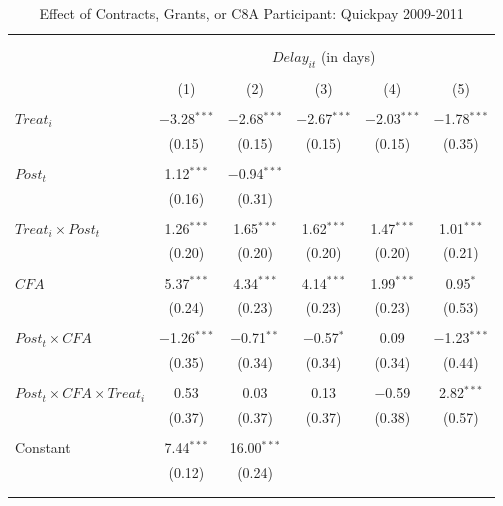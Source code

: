 \documentclass[
]{article}
\begin{document}
\begin{table}[H] \centering 
  \caption{Effect of Contracts, Grants, or C8A Participant: Quickpay 2009-2011} 
  \label{} 
\small 
\begin{tabular}{@{\extracolsep{-2pt}}lccccc} 
\\[-1.8ex]\hline 
\hline \\[-1.8ex] 
\\[-1.8ex] & \multicolumn{5}{c}{$Delay_{it}$ (in days)} \\ 
\\[-1.8ex] & (1) & (2) & (3) & (4) & (5)\\ 
\hline \\[-1.8ex] 
 $Treat_i$ & $-$3.28$^{***}$ & $-$2.68$^{***}$ & $-$2.67$^{***}$ & $-$2.03$^{***}$ & $-$1.78$^{***}$ \\ 
  & (0.15) & (0.15) & (0.15) & (0.15) & (0.35) \\ 
  & & & & & \\ 
 $Post_t$ & 1.12$^{***}$ & $-$0.94$^{***}$ &  &  &  \\ 
  & (0.16) & (0.31) &  &  &  \\ 
  & & & & & \\ 
 $Treat_i \times Post_t$ & 1.26$^{***}$ & 1.65$^{***}$ & 1.62$^{***}$ & 1.47$^{***}$ & 1.01$^{***}$ \\ 
  & (0.20) & (0.20) & (0.20) & (0.20) & (0.21) \\ 
  & & & & & \\ 
 $CFA$ & 5.37$^{***}$ & 4.34$^{***}$ & 4.14$^{***}$ & 1.99$^{***}$ & 0.95$^{*}$ \\ 
  & (0.24) & (0.23) & (0.23) & (0.23) & (0.53) \\ 
  & & & & & \\ 
 $Post_t \times CFA$ & $-$1.26$^{***}$ & $-$0.71$^{**}$ & $-$0.57$^{*}$ & 0.09 & $-$1.23$^{***}$ \\ 
  & (0.35) & (0.34) & (0.34) & (0.34) & (0.44) \\ 
  & & & & & \\ 
 $Post_t \times CFA \times Treat_i$ & 0.53 & 0.03 & 0.13 & $-$0.59 & 2.82$^{***}$ \\ 
  & (0.37) & (0.37) & (0.37) & (0.38) & (0.57) \\ 
  & & & & & \\ 
 Constant & 7.44$^{***}$ & 16.00$^{***}$ &  &  &  \\ 
  & (0.12) & (0.24) &  &  &  \\ 
  & & & & & \\ 
\hline \\[-1.8ex] 

\end{tabular}
\end{table}
\end{document}
